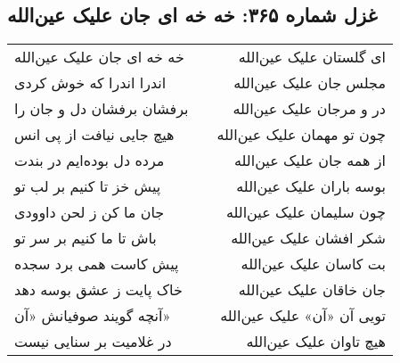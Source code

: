 \begin{center}
\section*{غزل شماره ۳۶۵: خه خه ای جان علیک عین‌الله}
\label{sec:365}
\begin{longtable}{l p{0.5cm} r}
خه خه ای جان علیک عین‌الله
&&
ای گلستان علیک عین‌الله
\\
اندرا اندرا که خوش کردی
&&
مجلس جان علیک عین‌الله
\\
برفشان برفشان دل و جان را
&&
در و مرجان علیک عین‌الله
\\
هیچ جایی نیافت از پی انس
&&
چون تو مهمان علیک عین‌الله
\\
مرده دل بوده‌ایم در بندت
&&
از همه جان علیک عین‌الله
\\
پیش خز تا کنیم بر لب تو
&&
بوسه باران علیک عین‌الله
\\
جان ما کن ز لحن داوودی
&&
چون سلیمان علیک عین‌الله
\\
باش تا ما کنیم بر سر تو
&&
شکر افشان علیک عین‌الله
\\
پیش کاست همی برد سجده
&&
بت کاسان علیک عین‌الله
\\
خاک پایت ز عشق بوسه دهد
&&
جان خاقان علیک عین‌الله
\\
آنچه گویند صوفیانش «آن»
&&
تویی آن «آن» علیک عین‌الله
\\
در غلامیت بر سنایی نیست
&&
هیچ تاوان علیک عین‌الله
\\
\end{longtable}
\end{center}
